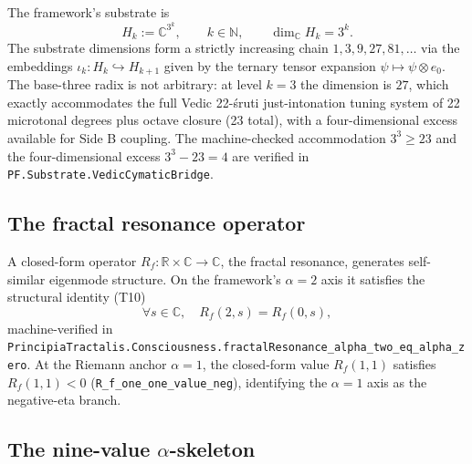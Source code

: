 \documentclass[11pt,a4paper]{article}
\theoremstyle{definition}
\begin{document}
The framework's substrate is
\begin{equation}
H_k := \mathbb{C}^{3^k}, \qquad k \in \mathbb{N}, \qquad \dim_{\mathbb{C}} H_k = 3^k.
\end{equation}
The substrate dimensions form a strictly increasing chain $1, 3, 9,
27, 81, \ldots$ via the embeddings $\iota_k : H_k \hookrightarrow
H_{k+1}$ given by the ternary tensor expansion $\psi \mapsto \psi
\otimes e_0$. The base-three radix is not arbitrary: at level $k = 3$
the dimension is $27$, which exactly accommodates the full Vedic
22-\'sruti just-intonation tuning system \cite{bharatamuninatyashastra}
of 22 microtonal degrees plus octave closure (23 total), with a
four-dimensional excess available for Side B coupling. The
machine-checked accommodation $3^3 \geq 23$ and the four-dimensional
excess $3^3 - 23 = 4$ are verified in
\texttt{PF.Substrate.VedicCymaticBridge}.

\subsection{The fractal resonance operator}

A closed-form operator $R_f : \mathbb{R} \times \mathbb{C} \to \mathbb{C}$,
the fractal resonance, generates self-similar eigenmode structure.
On the framework's $\alpha = 2$ axis it satisfies the structural
identity (T10)
\begin{equation}
\forall s \in \mathbb{C}, \quad R_f(2, s) = R_f(0, s),
\end{equation}
machine-verified in \texttt{PrincipiaTractalis.Consciousness.fractalResonance\_alpha\_two\_eq\_alpha\_zero}.
At the Riemann anchor $\alpha = 1$, the closed-form value $R_f(1, 1)$
satisfies $R_f(1, 1) < 0$ (\texttt{R\_f\_one\_one\_value\_neg}),
identifying the $\alpha = 1$ axis as the negative-eta branch.

\subsection{The nine-value \texorpdfstring{$\alpha$}{alpha}-skeleton}
\end{document}
